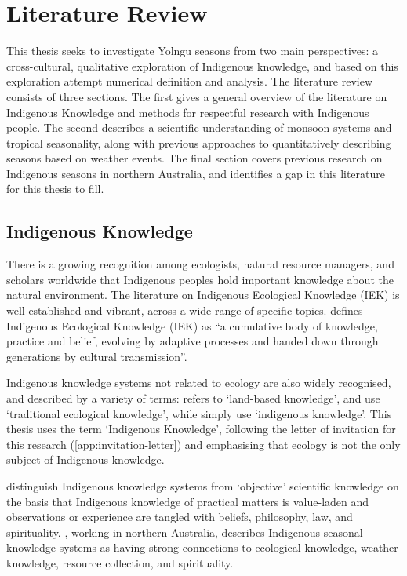 \chapter{Literature Review}
\label{ch:lit-review}

This thesis seeks to investigate Yolngu seasons from two main perspectives:
a cross-cultural, qualitative exploration of Indigenous knowledge, and
based on this exploration attempt numerical definition and analysis.
%
The literature review consists of three sections.  The first gives a general
overview of the literature on Indigenous Knowledge and methods for respectful
research with Indigenous people.  The second describes a scientific
understanding of monsoon systems and tropical seasonality, along with previous
approaches to quantitatively describing seasons based on weather events.
The final section covers previous research on Indigenous seasons in northern
Australia, and identifies a gap in this literature for this thesis to fill.


\section{Indigenous Knowledge}
\label{sec:lit-iek}

There is a growing recognition among ecologists, natural resource managers, and
scholars worldwide that Indigenous peoples hold important knowledge about the
natural environment.  The literature on Indigenous Ecological Knowledge (IEK)
is well-established and vibrant, across a wide range of specific topics.
\citet{berkes2012} defines Indigenous Ecological Knowledge (IEK) as ``a cumulative
body of knowledge, practice and belief, evolving by adaptive processes and
handed down through generations by cultural transmission''.

Indigenous knowledge systems not related to ecology are also widely recognised,
and described by a variety of terms:  \citet{clarke2009} refers to `land-based
knowledge', \citet{petheram2010} and \citet{turner2009} use `traditional
ecological knowledge', while \citet{cochran2015} simply use `indigenous
knowledge'.  This thesis uses the term `Indigenous Knowledge', following the
letter of invitation for this research (\cref{app:invitation-letter}) and
emphasising that ecology is not the only subject of Indigenous knowledge.


\citet{turner2009} distinguish Indigenous knowledge systems from `objective'
scientific knowledge on the basis that Indigenous knowledge of practical
matters is value-laden and observations or experience are tangled with beliefs,
philosophy, law, and spirituality.  \citet{woodward2012b}, working in northern
Australia, describes Indigenous seasonal knowledge systems as having strong connections
to ecological knowledge, weather knowledge, resource collection, and spirituality.

